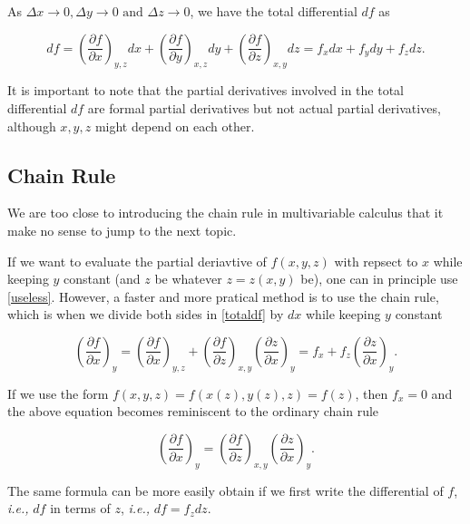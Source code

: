 \documentclass[english,a4paper,12pt]{report}
\begin{document}
As \(\Delta x \to 0, \Delta y \to 0 \text { and } \Delta z \to 0\), we have the total differential \(df\) as 

\begin{equation} \label{totaldf} 
	df = \left( \frac{\partial f}{\partial x} \right)_{y,z} dx + \left( \frac{\partial f}{\partial y} \right)_{x,z} dy + \left( \frac{\partial f}{\partial z} \right)_{x,y} dz = f_{x} dx + f_{y}dy + f_{z}dz.     
\end{equation}

It is important to note that the partial derivatives involved in the total differential \(df\) are formal partial derivatives but not actual partial derivatives, although \(x,y,z\) might depend on each other.  

\subsection{Chain Rule}

We are too close to introducing the chain rule in multivariable calculus that it make no sense to jump to the next topic.

If we want to evaluate the partial deriavtive of \(f(x,y,z)\) with repsect to \(x\) while keeping \(y\) constant (and \(z\) be whatever \(z = z(x,y)\) be), one can in principle use \cref{useless}. However, a faster and more pratical method is to use the chain rule, which is when we divide both sides in \cref{totaldf} by \(dx\) while keeping \(y\) constant

\begin{equation}
	\left( \frac{\partial f}{\partial x} \right)_{y} = \left( \frac{\partial f}{\partial x} \right)_{y,z} + \left( \frac{\partial f}{\partial z} \right)_{x,y} \left( \frac{\partial z}{\partial x} \right)_{y} = f_{x} + f_{z} \left( \frac{\partial z}{\partial x} \right)_{y}. 
\end{equation}

If we use the form \(f(x,y,z) = f(x(z),y(z),z) = f(z)\), then \(f_{x} = 0 \) and the above equation becomes reminiscent to the ordinary chain rule

\begin{equation}
	\left( \frac{\partial f}{\partial x} \right)_{y} = \left( \frac{\partial f}{\partial z} \right)_{x,y} \left( \frac{\partial z}{\partial x} \right)_{y}. 
\end{equation}

The same formula can be more easily obtain if we first write the differential of \(f\), \textit{i.e.,} \(df\) in terms of \(z\), \textit{i.e.,} \(df = f_{z}dz \).  
\end{document}
